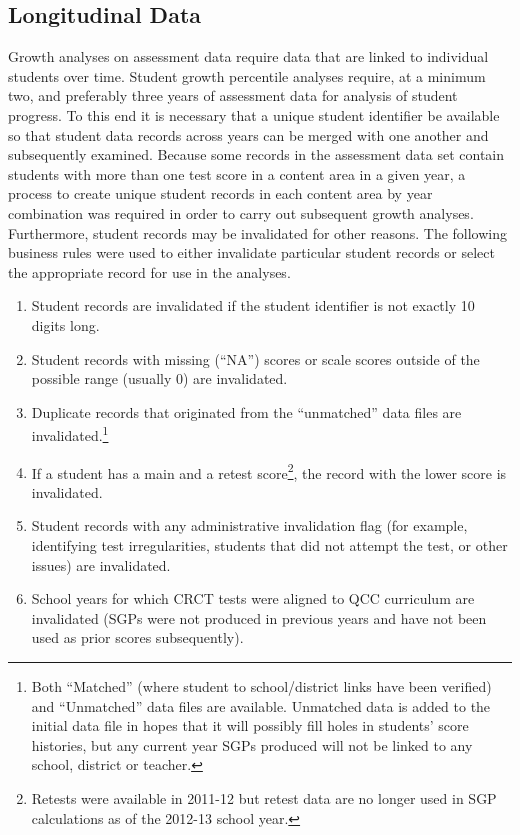 \documentclass[12pt]{article}
\begin{document}
\subsection{Longitudinal Data}\label{longitudinal-data}

Growth analyses on assessment data require data that are linked to
individual students over time. Student growth percentile analyses
require, at a minimum two, and preferably three years of assessment data
for analysis of student progress. To this end it is necessary that a
unique student identifier be available so that student data records
across years can be merged with one another and subsequently examined.
Because some records in the assessment data set contain students with
more than one test score in a content area in a given year, a process to
create unique student records in each content area by year combination
was required in order to carry out subsequent growth analyses.
Furthermore, student records may be invalidated for other reasons. The
following business rules were used to either invalidate particular
student records or select the appropriate record for use in the
analyses.


\begin{enumerate}
\def\labelenumi{\arabic{enumi}.}
\itemsep1pt\parskip0pt
\item
  Student records are invalidated if the student identifier is not
  exactly 10 digits long.
\item
  Student records with missing (``NA'') scores or scale scores outside
  of the possible range (usually 0) are invalidated.
\item
  Duplicate records that originated from the ``unmatched'' data files
  are invalidated.\footnote{Both ``Matched'' (where student to
    school/district links have been verified) and ``Unmatched'' data
    files are available. Unmatched data is added to the initial data
    file in hopes that it will possibly fill holes in students' score
    histories, but any current year SGPs produced will not be linked to
    any school, district or teacher.}
\item
  If a student has a main and a retest score\footnote{Retests were
    available in 2011-12 but retest data are no longer used in SGP
    calculations as of the 2012-13 school year.}, the record with the
  lower score is invalidated.
\item
  Student records with any administrative invalidation flag (for
  example, identifying test irregularities, students that did not
  attempt the test, or other issues) are invalidated.
\item
  School years for which CRCT tests were aligned to QCC curriculum are
  invalidated (SGPs were not produced in previous years and have not
  been used as prior scores subsequently).
\end{enumerate}
\end{document}
